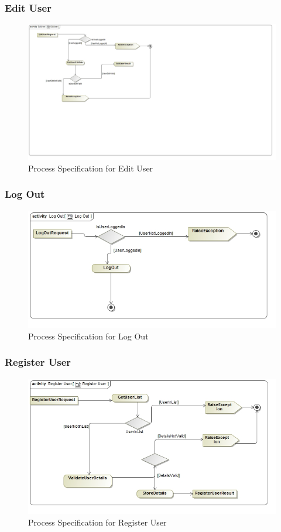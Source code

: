 \documentclass[a4paper,10pt]{article}
\begin{document}
\subsubsection{Edit User}
	\begin{figure}[h]
	\includegraphics[scale=0.5]{ActEditUser}
	\caption{Process Specification for Edit User}
	\end{figure}
		
\subsubsection{Log Out}
	\begin{figure}[h]
	\includegraphics[scale=0.5]{ActLogOut}
	\caption{Process Specification for Log Out}
	\end{figure}
		
\subsubsection{Register User}
	\begin{figure}[h]
	\includegraphics[scale=0.5]{ActRegisterUser}
	\caption{Process Specification for Register User}
	\end{figure}
		
\end{document}
